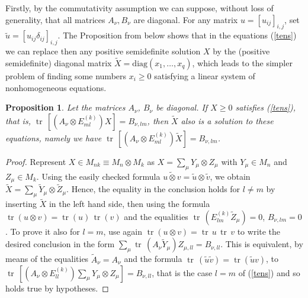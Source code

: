 \documentclass[12pt]{amsart}
\newtheorem{proposition}[theorem]{Proposition}
\theoremstyle{definition}
\begin{document}
Firstly, by the commutativity assumption we can suppose, without loss of generality,  
that all matrices $A_\nu ,B_\nu$ are diagonal.
For any matrix $u=[u_{ij}]_{i,j}$, set $\tilde{u}=[u_{ij}\delta_{ij}]_{i,j}$. 
The Proposition from below shows that in the equations
(\ref{tens}) we can replace then any positive semidefinite solution
$X $  by the (positive semidefinite) diagonal matrix 
$\tilde{X}=\mathrm{diag} (x_1 ,\ldots ,x_q )$, which leads to the simpler problem of finding 
some numbers $x_i \geq 0$ satisfying a linear system of 
nonhomogeneous  equations.

\begin{proposition}\label{p:c}
Let the matrices $A_\nu$, $B_\nu$  be diagonal. If $X\geq 0$ satisfies  (\ref{tens}), that is,
${\operatorname{tr}}\, [(A_\nu \otimes   E_{ml}^{(k)}){X} ]=B_{\nu , lm}$, then 
$\widetilde{X}$ also is a solution to these equations, namely we have ${\operatorname{tr}}\, [(A_\nu \otimes   E_{ml}^{(k)})\widetilde{X} ]=B_{\nu , lm}$. 
\end{proposition}

\begin{proof}  Represent $X\in M_{nk}\equiv M_n \otimes M_k$ as $X=\sum_\mu Y_
\mu \otimes Z_\mu $ with $Y_\mu \in M_n$ and $Z_\mu \in M_k$. Using the easily 
checked formula $\widetilde{u\otimes v}=\tilde{u}\otimes \tilde{v}$,
we obtain $\tilde{X}=\sum_\mu \tilde{Y}_\mu \otimes \tilde{Z}_\mu $.
Hence, the  equality in the conclusion holds for $l\not =m$
 by inserting $\widetilde{X}$ in the left hand side, then using the formula 
 ${\operatorname{tr}} (u\otimes v)={\operatorname{tr}}( u) \, {\operatorname{tr}}(v)$ and the equalities  ${\operatorname{tr}}\, (E_{lm}^{(k)}\tilde{Z}_\mu )
 =0$, $B_{\nu , lm}=0$.
To prove it also for $l=m$, 
use again ${\operatorname{tr}} (u\otimes v)={\operatorname{tr}}\, u \, {\operatorname{tr}}\, v$
to write the desired conclusion in the form  $\sum_\mu {\operatorname{tr}}\, 
(A_\nu \tilde{Y}_\mu )Z_{\mu ,ll}=B_{\nu , ll}$. 
This is equivalent, by means of the equalities
$\tilde{A}_\nu =A_\nu$ and  the formula ${\operatorname{tr}}\, (\tilde{u}\tilde{v})= {\operatorname{tr}} (\tilde{u}v)$, to 
 ${\operatorname{tr}}\, [(A_\nu \otimes E_{ll}^{(k)})\sum_\mu {Y}_\mu \otimes {Z}_\mu ]=B_{\nu , ll}$, that is the case $l=m$ of (\ref{tens}) and so holds true by hypotheses. \end{proof}
\end{document}
